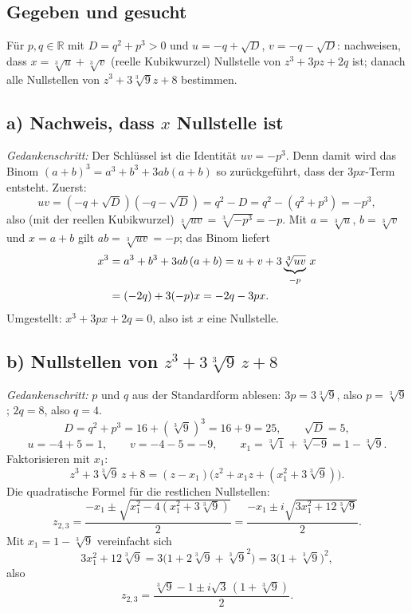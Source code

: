 
\subsection*{Gegeben und gesucht}
Für $p,q\in\mathbb R$ mit $D=q^2+p^3>0$ und $u=-q+\sqrt D$, $v=-q-\sqrt D$:
nachweisen, dass $x=\sqrt[3]{u}+\sqrt[3]{v}$ (reelle Kubikwurzel)
Nullstelle von $z^3+3pz+2q$ ist; danach alle Nullstellen von
$z^3+3\sqrt[3]{9}z+8$ bestimmen.

\subsection*{a) Nachweis, dass $x$ Nullstelle ist}
\emph{Gedankenschritt:} Der Schlüssel ist die Identität
$uv=-p^3$. Denn damit wird das Binom $(a+b)^3=a^3+b^3+3ab(a+b)$ so
zurückgeführt, dass der $3px$-Term entsteht.
Zuerst:
\begin{equation*}
  uv=(-q+\sqrt D)(-q-\sqrt D)=q^2-D=q^2-(q^2+p^3)=-p^3,
\end{equation*}
also (mit der reellen Kubikwurzel) $\sqrt[3]{uv}=\sqrt[3]{-p^3}=-p$. Mit
$a=\sqrt[3]{u}$, $b=\sqrt[3]{v}$ und $x=a+b$ gilt $ab=\sqrt[3]{uv}=-p$;
das Binom liefert
\begin{align*}
  x^3&=a^3+b^3+3ab\,(a+b)=u+v+3\underbrace{\sqrt[3]{uv}}_{\mathstrut -p}\,x\\
     &=(-2q)+3(-p)x=-2q-3px .
\end{align*}
Umgestellt: $x^3+3px+2q=0$, also ist $x$ eine Nullstelle.

\subsection*{b) Nullstellen von $z^3+3\sqrt[3]{9}\,z+8$}
\emph{Gedankenschritt:} $p$ und $q$ aus der Standardform ablesen:
$3p=3\sqrt[3]{9}$, also $p=\sqrt[3]{9}$; $2q=8$, also $q=4$.
\begin{equation*}
  D=q^2+p^3=16+(\sqrt[3]{9})^3=16+9=25,\qquad \sqrt D=5,
\end{equation*}
\begin{equation*}
  u=-4+5=1,\qquad v=-4-5=-9,
  \qquad x_1=\sqrt[3]{1}+\sqrt[3]{-9}=1-\sqrt[3]{9}.
\end{equation*}
Faktorisieren mit $x_1$:
\begin{equation*}
  z^3+3\sqrt[3]{9}\,z+8
  =(z-x_1)\bigl(z^2+x_1z+(x_1^2+3\sqrt[3]{9})\bigr).
\end{equation*}
Die quadratische Formel für die restlichen Nullstellen:
\begin{equation*}
  z_{2,3}=\frac{-x_1\pm\sqrt{x_1^2-4(x_1^2+3\sqrt[3]{9})}}{2}
  =\frac{-x_1\pm i\sqrt{3x_1^2+12\sqrt[3]{9}}}{2}.
\end{equation*}
Mit $x_1=1-\sqrt[3]{9}$ vereinfacht sich
\begin{equation*}
  3x_1^2+12\sqrt[3]{9}
  =3\bigl(1+2\sqrt[3]{9}+\sqrt[3]{9}^2\bigr)
  =3\bigl(1+\sqrt[3]{9}\bigr)^2,
\end{equation*}
also
\begin{equation*}
  z_{2,3}=\frac{\sqrt[3]{9}-1\pm i\sqrt3\,(1+\sqrt[3]{9})}{2}.
\end{equation*}

